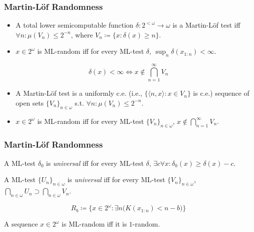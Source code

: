 \documentclass[UTF8,11pt,colorlinks,compress,openany]{beamer}%
\begin{document}
\begin{frame}\frametitle{Martin-L\"of Randomness}
\setlength\abovedisplayskip{0pt}
\setlength\belowdisplayskip{0pt}
\begin{definition}
\begin{itemize}
	\item A total lower semicomputable function $\delta: 2^{<\omega}\to\omega$ is a Martin-Löf test iff $\forall n:\mu(V_n)\leq 2^{-n}$, where $V_n\coloneqq \{x:\delta(x)\geq n\}$.
	\item $x\in 2^\omega$ is ML-random iff for every ML-test $\delta$, $\sup_n\delta(x_{1:n})<\infty$.
\end{itemize}
\end{definition}
\[\delta(x)<\infty\iff x\notin\bigcap\limits_{n=1}^\infty V_n\]
\begin{definition}
\begin{itemize}
	\item A Martin-Löf test is a uniformly c.e. (i.e., $\big\{\langle n,x\rangle: x\in V_n\big\}$ is c.e.) sequence of open sets $\{V_n\}_{n\in\omega}$ s.t. $\forall n: \mu(V_n)\leq 2^{-n}$.
	\item $x\in 2^\omega$ is ML-random iff for every ML-test $\{V_n\}_{n\in\omega}$, $x\notin\bigcap\limits_{n=1}^\infty V_n$.
\end{itemize}
\end{definition}
\end{frame}

\begin{frame}\frametitle{Martin-L\"of Randomness}
\setlength\abovedisplayskip{0pt}
\setlength\belowdisplayskip{0pt}
\begin{definition}
A ML-test $\delta_0$ is \emph{universal} iff for every ML-test $\delta$, $\exists c\forall x:\delta_0(x)\geq\delta(x)-c$.
\end{definition}
A ML-test $\{U_n\}_{n\in\omega}$ is \emph{universal} iff for every ML-test $\{V_n\}_{n\in\omega}$, $\bigcap\limits_{n\in\omega}U_n\supset\bigcap\limits_{n\in\omega}V_n$.
\begin{center}
\end{center}
\[R_b\coloneqq \big\{x\in 2^\omega:\exists n\big(K(x_{1:n})<n-b\big)\big\}\]
\begin{center}
\end{center}
\begin{theorem}[Schnorr 1973]
A sequence $x\in 2^\omega$ is ML-random iff it is $1$-random.
\end{theorem}
\end{frame}
\end{document}
